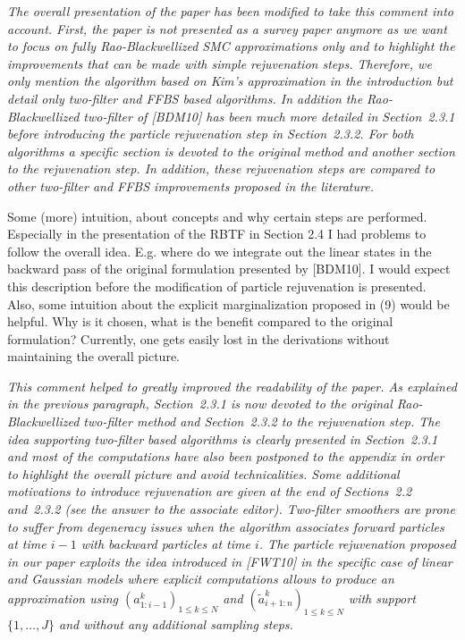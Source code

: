 \vspace{.2cm}

{\em
\noindent The overall presentation of the paper has been modified to take this comment into account. First, the paper is not presented as a survey paper anymore as we want to focus on fully Rao-Blackwellized SMC approximations only and to highlight the improvements that can be made with simple rejuvenation steps. Therefore, we only mention the algorithm based on Kim's approximation in the introduction but detail only two-filter and FFBS based algorithms. In addition the Rao-Blackwellized two-filter of [BDM10] has been much more detailed in Section~2.3.1 before introducing the particle rejuvenation step in Section~2.3.2. For both algorithms a specific section is devoted to the original method and another section to the rejuvenation step. In addition, these rejuvenation steps are compared to other two-filter and FFBS improvements proposed in the literature.
}

\vspace{.5cm}

\noindent Some (more) intuition, about concepts and why certain steps are performed. Especially in the presentation of the RBTF in Section 2.4 I had problems to follow the overall idea. E.g. where do we integrate out the linear states in the backward pass of the original formulation presented by [BDM10]. I would expect this description before the modification of particle rejuvenation is presented. Also, some intuition about the explicit marginalization proposed in (9) would be helpful. Why is it chosen, what is the benefit compared to the original formulation? Currently, one gets easily lost in the derivations without maintaining the overall picture. 

\vspace{.2cm}

{\em
\noindent  This comment helped to greatly improved the readability of the paper. As explained in the previous paragraph, Section~2.3.1 is now devoted to the original Rao-Blackwellized two-filter method and Section~2.3.2 to the rejuvenation step. The idea supporting two-filter based algorithms is clearly presented in Section~2.3.1 and most of the computations have also been postponed to the appendix in order to highlight the overall picture and avoid technicalities. Some additional motivations to introduce rejuvenation are given at the end of Sections~2.2 and~2.3.2 (see the answer to the associate editor). Two-filter smoothers are prone to suffer from degeneracy issues when the algorithm associates forward particles at time $i-1$ with backward particles at time $i$. The particle rejuvenation proposed in our paper exploits the idea introduced in [FWT10] in the specific case of linear and Gaussian models where explicit computations allows to produce an approximation using $(a^k_{1:i-1})_{1\le k \le N}$ and $(\tilde{a}^k_{i+1:n})_{1\le k \le N}$ with support $\{1,\ldots,J\}$ and without any additional sampling steps.
}

